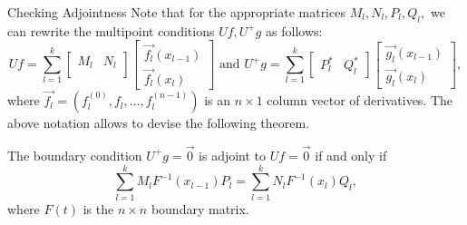 \documentclass[serif, final, noamsthm]{beamer} %
\begin{document}
\begin{center}
\begin{frame}
\begin{columns}[t]
{	%
\begin{block}{Checking Adjointness}
\justifying
Note that for the appropriate matrices $M_l, N_l, P_l, Q_l,$ we can rewrite the multipoint conditions $Uf, U^+g$ as follows:
\begin{equation}\label{AdjointConditions}
Uf =
\sum^k_{l=1}
\begin{bmatrix}
M_l & N_l \\
\end{bmatrix} 
\begin{bmatrix}
\vec{f_l}(x_{l-1})  \\
\vec{f_l}(x_{l})
\end{bmatrix} \mbox{ and } 
U^+ g =
\sum^k_{l=1}
\begin{bmatrix}
P_l^* & Q_l^*
\end{bmatrix}
\begin{bmatrix}
\vec{g_l}(x_{l-1})  \\
\vec{g_l}(x_{l})
\end{bmatrix},
\end{equation}
where $\vec{f_l} = (f_l^{(0)}, f_l, \ldots, f_l^{(n-1)})$ is an $n \times 1$ column vector of derivatives.
The above notation allows to devise the following theorem.
\begin{thm}\label{P2.CA-theorem}
The boundary condition $U^+g = \vec{0}$ is adjoint to $Uf = \vec{0}$ if and only if \[ \sum^k_{l=1} M_lF^{-1}(x_{l-1})P_l = \sum^k_{l=1} N_l F^{-1}(x_l)Q_l, \] where $F(t)$ is the $n\times n$ boundary matrix.  
\end{thm}
\end{block}
}
\end{columns}
\end{frame}
\end{center}
\end{document}
